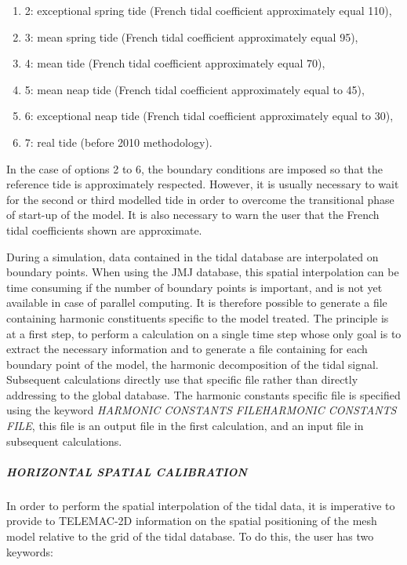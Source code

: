 \documentclass{article} %
\begin{document}
\begin{enumerate}
\item  2: exceptional spring tide (French tidal coefficient approximately equal 110),

\item  3: mean spring tide (French tidal coefficient approximately equal 95),

\item  4: mean tide (French tidal coefficient approximately equal 70),

\item  5: mean neap tide (French tidal coefficient approximately equal to 45),

\item  6: exceptional neap tide (French tidal coefficient approximately equal to 30),

\item  7: real tide (before 2010 methodology).
\end{enumerate}

 In the case of options 2 to 6, the boundary conditions are imposed so that the reference tide is approximately respected. However, it is usually necessary to wait for the second or third modelled tide in order to overcome the transitional phase of start-up of the model. It is also necessary to warn the user that the French tidal coefficients shown are approximate.

 During a simulation, data contained in the tidal database are interpolated on boundary points. When using the JMJ database, this spatial interpolation can be time consuming if the number of boundary points is important, and is not yet available in case of parallel computing. It is therefore possible to generate a file containing harmonic constituents specific to the model treated. The principle is at a first step, to perform a calculation on a single time step whose only goal is to extract the necessary information and to generate a file containing for each boundary point of the model, the harmonic decomposition of the tidal signal. Subsequent calculations directly use that specific file rather than directly addressing to the global database. The harmonic constants specific file is specified using the keyword \textit{HARMONIC CONSTANTS FILEHARMONIC CONSTANTS FILE}, this file is an output file in the first calculation, and an input file in subsequent calculations.


\subparagraph{ HORIZONTAL SPATIAL CALIBRATION}

 In order to perform the spatial interpolation of the tidal data, it is imperative to provide to TELEMAC-2D information on the spatial positioning of the mesh model relative to the grid of the tidal database. To do this, the user has two keywords:
\end{document}
